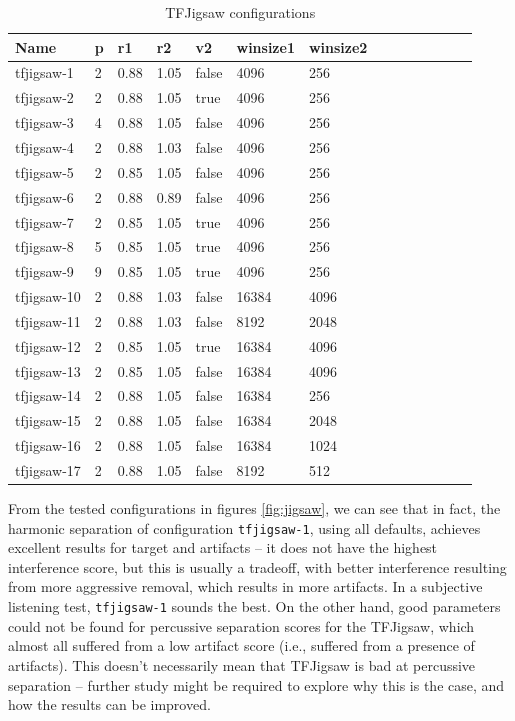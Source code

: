 \documentclass[letter,12pt]{article}
\begin{document}
\begin{table}[ht]
	\centering
\begin{tabular}{ |l|l|l|l|l|l|l| |c|c|c|c|c|c|c| }
	 \hline
	  Name & p & r1 & r2 & v2 & winsize1 & winsize2 \\
	 \hline
	 \hline
	 tfjigsaw-1 & 2 & 0.88 & 1.05 & false & 4096 & 256 \\
	 \hline
	 tfjigsaw-2 & 2 & 0.88 & 1.05 & true & 4096 & 256 \\
	 \hline
	 tfjigsaw-3 & 4 & 0.88 & 1.05 & false & 4096 & 256 \\
	 \hline
	 tfjigsaw-4 & 2 & 0.88 & 1.03 & false & 4096 & 256 \\
	 \hline
	 tfjigsaw-5 & 2 & 0.85 & 1.05 & false & 4096 & 256 \\
	 \hline
	 tfjigsaw-6 & 2 & 0.88 & 0.89 & false & 4096 & 256 \\
	 \hline
	 tfjigsaw-7 & 2 & 0.85 & 1.05 & true & 4096 & 256 \\
	 \hline
	 tfjigsaw-8 & 5 & 0.85 & 1.05 & true & 4096 & 256 \\
	 \hline
	 tfjigsaw-9 & 9 & 0.85 & 1.05 & true & 4096 & 256 \\
	 \hline
	 tfjigsaw-10 & 2 & 0.88 & 1.03 & false & 16384 & 4096 \\
	 \hline
	 tfjigsaw-11 & 2 & 0.88 & 1.03 & false & 8192 & 2048 \\
	 \hline
	 tfjigsaw-12 & 2 & 0.85 & 1.05 & true & 16384 & 4096 \\
	 \hline
	 tfjigsaw-13 & 2 & 0.85 & 1.05 & false & 16384 & 4096 \\
	 \hline
	 tfjigsaw-14 & 2 & 0.88 & 1.05 & false & 16384 & 256 \\
	 \hline
	 tfjigsaw-15 & 2 & 0.88 & 1.05 & false & 16384 & 2048 \\
	 \hline
	 tfjigsaw-16 & 2 & 0.88 & 1.05 & false & 16384 & 1024 \\
	 \hline
	 tfjigsaw-17 & 2 & 0.88 & 1.05 & false & 8192 & 512 \\
	 \hline
\end{tabular}
	\caption{TFJigsaw configurations}
	\label{table:round2jigsaw}
\end{table}

From the tested configurations in figures \ref{fig:jigsaw}, we can see that in fact, the harmonic separation of configuration \Verb#tfjigsaw-1#, using all defaults, achieves excellent results for target and artifacts -- it does not have the highest interference score, but this is usually a tradeoff, with better interference resulting from more aggressive removal, which results in more artifacts. In a subjective listening test, \Verb#tfjigsaw-1# sounds the best. On the other hand, good parameters could not be found for percussive separation scores for the TFJigsaw, which almost all suffered from a low artifact score (i.e., suffered from a presence of artifacts). This doesn't necessarily mean that TFJigsaw  is bad at percussive separation -- further study might be required to explore why this is the case, and how the results can be improved.
\end{document}
